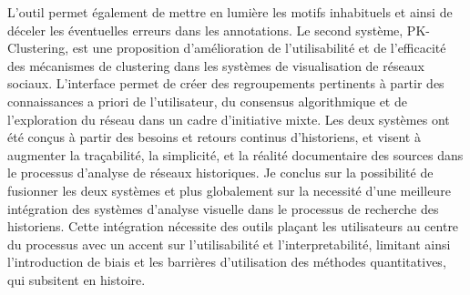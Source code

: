 {L’outil permet également de mettre en lumière les motifs inhabituels et ainsi de déceler les éventuelles erreurs dans les annotations.
Le second système, PK-Clustering, est une proposition d'amélioration de l'utilisabilité et de l'efficacité des mécanismes de clustering dans les systèmes de visualisation de réseaux sociaux.
L'interface permet de créer des regroupements pertinents à partir des connaissances a priori de l'utilisateur, du consensus algorithmique et de l'exploration du réseau dans un cadre d'initiative mixte.
Les deux systèmes ont été conçus à partir des besoins et retours continus d'historiens, et visent à augmenter la traçabilité, la simplicité, et la réalité documentaire des sources dans le processus d'analyse de réseaux historiques.
Je conclus sur la possibilité de fusionner les deux systèmes et plus globalement sur la necessité d'une meilleure intégration des systèmes d'analyse visuelle dans le processus de recherche des historiens.
Cette intégration nécessite des outils plaçant les utilisateurs au centre du processus avec un accent sur l'utilisabilité et l'interpretabilité, limitant ainsi l'introduction de biais et les barrières d'utilisation des méthodes quantitatives, qui subsitent en histoire.}